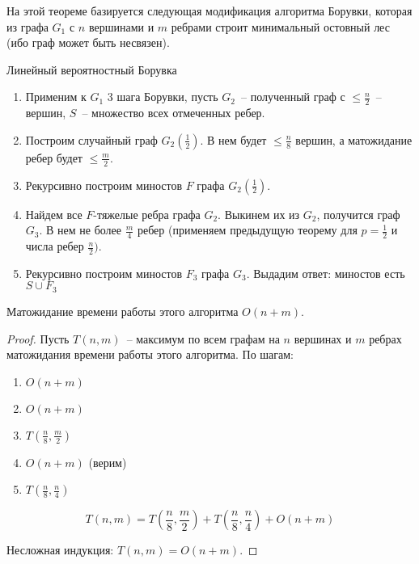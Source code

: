 На этой теореме базируется следующая модификация алгоритма Борувки, которая из графа $G_1$ с $n$ вершинами и $m$ ребрами строит минимальный остовный лес (ибо граф может быть несвязен).

\begin{algodescription}{Линейный вероятностный Борувка}
\begin{enumerate}
    \item Применим к $G_1$ 3 шага Борувки, пусть $G_2$~-- полученный граф с $\leq \frac{n}{2}$~-- вершин, $S$~-- множество всех отмеченных ребер.
    \item Построим случайный граф $G_2\left(\frac{1}{2}\right)$. В нем будет $\leq\frac{n}{8}$ вершин, а матожидание ребер будет $\leq\frac{m}{2}$.
    \item Рекурсивно построим миностов $F$ графа $G_2\left(\frac{1}{2}\right)$.
    \item Найдем все $F$-тяжелые ребра графа $G_2$. Выкинем их из $G_2$, получится граф $G_3$. В нем не более $\frac{m}{4}$ ребер (применяем предыдущую теорему для $p=\frac{1}{2}$ и числа ребер $\frac{n}{2})$.
    \item Рекурсивно построим миностов $F_3$ графа $G_3$. Выдадим ответ: миностов есть $S \cup F_3$
\end{enumerate}
\end{algodescription}

\begin{theorem*}
    Матожидание времени работы этого алгоритма $O(n+m)$.
\end{theorem*}
\begin{proof}
    Пусть $T(n, m)$~-- максимум по всем графам на $n$ вершинах и $m$ ребрах матожидания времени работы этого алгоритма.
    По шагам:
    \begin{enumerate}
        \item $O(n+m)$
        \item $O(n+m)$
        \item $T\left(\frac{n}{8}, \frac{m}{2}\right)$
        \item $O(n+m)$ (верим)
        \item $T(\frac{n}{8}, \frac{n}{4})$
    \end{enumerate}

    $$T(n, m) = T\left(\frac{n}{8}, \frac{m}{2}\right) + T\left(\frac{n}{8}, \frac{n}{4}\right) + O(n+m)$$

    Несложная индукция: $T(n, m) = O(n+m)$.
\end{proof}
